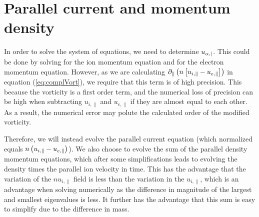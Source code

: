 \section{Parallel current and momentum density}
In order to solve the system of equations, we need to determine $u_{\alpha,|}$.
This could be done by solving for the ion momentum equation and for the electron
momentum equation. However, as we are calculating
$\partial_\|\left(n\left[u_{i,\|} - u_{e,\|}\right]\right)$ in equation (\ref{eq:complVort}),
we require that this term is of high precision. This because the vorticity is a
first order term, and the numerical loss of precision can be high when
subtracting $u_{i,\|}$ and $u_{e,\|}$ if they are almost equal to each other.
As a result, the numerical error may polute the calculated order of the
modified vorticity.

Therefore, we will instead evolve the parallel current equation (which
normalized equals $n\left(u_{i,\|} - u_{e,\|}\right)$). We also choose
to evolve the sum of the parallel density momentum equations, which after some
simplifications leads to evolving the density times the parallel
ion velocity in time. This has the advantage that the variation of the
$nu_{i,\|}$ field is less than the variation in the $u_{i,\|}$, which is an
advantage when solving numerically as the difference in magnitude of the
largest and smallest eigenvalues is less. It further has the advantage that
this sum is easy to simplify due to the difference in mass.

